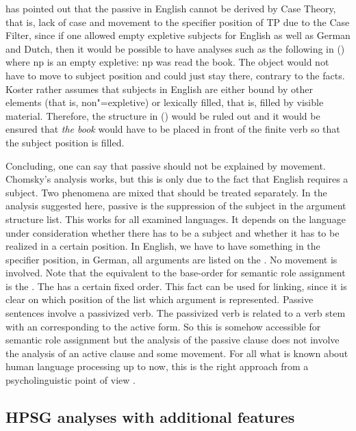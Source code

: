\citet[]{Koster86a} has pointed out that the passive in English cannot be derived by Case
Theory, that is, lack of case and movement to the specifier position of TP due to the Case Filter, since if one allowed empty expletive subjects for English as well as German and Dutch, then it would be possible
to have analyses such as the following in () where np is an empty expletive:
\ea
np was read the book.
\z
The object would not have to move to subject position and could just stay there, contrary to the facts.
Koster rather assumes that subjects in English are either bound by other elements (that is, non"=expletive) or lexically filled, that
is, filled by visible material.
Therefore, the structure in () would be ruled out and it would be ensured that \emph{the book} would have to be placed in front
of the finite verb so that the subject position is filled.

Concluding, one can say that passive should not be explained by movement. Chomsky's analysis works,
but this is only due to the fact that English requires a subject. Two phenomena are mixed that
should be treated separately. In the analysis suggested here, passive is the suppression of the
subject in the argument structure list. This works for all examined languages. It depends on the
language under consideration whether there has to be a subject and whether it has to be realized in
a certain position. In English, we have to have something in the specifier position, in German, all
arguments are listed on the \compsl. No movement is involved. Note that the equivalent to the
base-order for semantic role assignment is the \argstl. The \argstl has a certain fixed order. This fact
can be used for linking, since it is clear on which position of the list which argument is
represented. Passive sentences involve a passivized verb. The passivized verb is related to a verb
stem with an \argstl corresponding to the active form. So this \argstl is somehow accessible for
semantic role assignment but the analysis of the passive clause does not involve the analysis of an
active clause and some movement. For all what is known about human language processing up to now, this is
the right approach from a psycholinguistic point of view \citep[Section~3.2]{Wasow2021a}. 



\subsection{HPSG analyses with additional features}

